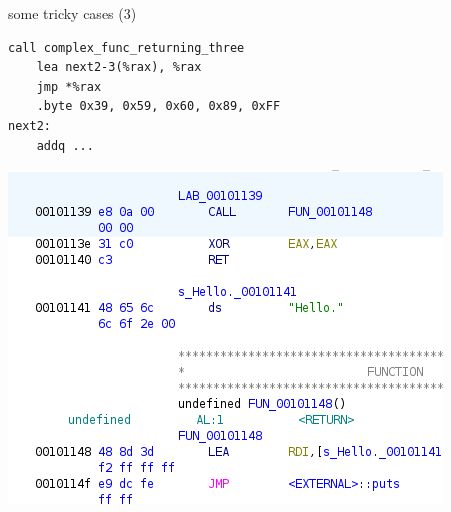 \begin{frame}[fragile]{some tricky cases (3)}
\begin{Verbatim}[fontsize=\small]
    call complex_func_returning_three
    lea next2-3(%rax), %rax
    jmp *%rax
    .byte 0x39, 0x59, 0x60, 0x89, 0xFF
next2:
    addq ...
\end{Verbatim}
\end{frame}


\begin{frame}
\includegraphics[height=\textheight]{../re-tools/ghidra-disass-mixed-detail}
\end{frame}
